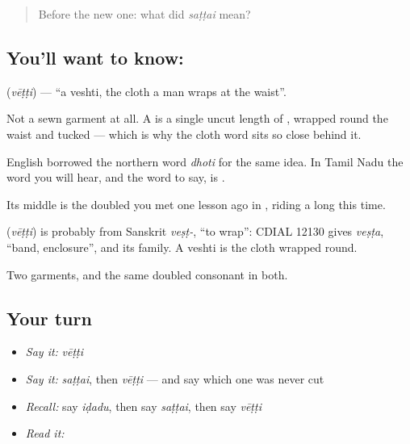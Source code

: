 \label{lesson:TA-C67-veshti}



\begin{quote}
Before the new one: what did \emph{saṭṭai} mean?
\end{quote}

\subsection*{You'll want to know: }
\textbf{} (\emph{vēṭṭi}) — \textquotedblleft{}a veshti, the cloth a man wraps at the waist\textquotedblright{}.

Not a sewn garment at all. A  is a single uncut length of , wrapped round the waist and tucked — which is why the cloth word sits so close behind it.

English borrowed the northern word \emph{dhoti} for the same idea. In Tamil Nadu the word you will hear, and the word to say, is .

Its middle is the doubled  you met one lesson ago in , riding a long  this time.

\begin{cousinweb}
\textbf{} (\emph{vēṭṭi}) is probably from Sanskrit \emph{veṣṭ-}, \textquotedblleft{}to wrap\textquotedblright{}: CDIAL 12130 gives \emph{veṣṭa}, \textquotedblleft{}band, enclosure\textquotedblright{}, and its family. A veshti is the cloth wrapped round.
\end{cousinweb}

\begin{grammarlens}[title={What you've built}]
Two garments, and the same doubled consonant in both.
\end{grammarlens}

\subsection*{Your turn}
\begin{itemize}
\raggedright
  \item \emph{Say it:} \emph{vēṭṭi}
  \item \emph{Say it:} \emph{saṭṭai}, then \emph{vēṭṭi} — and say which one was never cut
  \item \emph{Recall:} say \emph{iḍadu}, then say \emph{saṭṭai}, then say \emph{vēṭṭi}
  \item \emph{Read it:} \textbf{}
\end{itemize}

